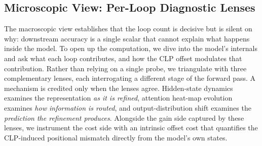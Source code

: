 \documentclass{llmxive}
\providecommand{\arraystretch}{0.96}
\begin{document}
\subsection{Microscopic View: Per-Loop Diagnostic Lenses}
\label{sec:exp-micro}
The macroscopic view establishes that the loop count is decisive but is
silent on why: downstream accuracy is a single scalar that cannot explain
what happens inside the model.
To open up the computation, we dive into the model's internals and ask what
each loop contributes, and how the CLP offset modulates that
contribution.
Rather than relying on a single probe, we triangulate with three complementary
lenses, each interrogating a different stage of the forward pass.
A mechanism is credited only when the lenses agree.
Hidden-state dynamics examines the
representation \emph{as it is refined}, attention heat-map evolution examines
\emph{how information is routed}, and output-distribution shift examines the
\emph{prediction the refinement produces}.
Alongside the gain side captured by these lenses, we instrument the cost side
with an intrinsic offset cost that quantifies the CLP-induced positional
mismatch directly from the model's own states.

\end{document}
